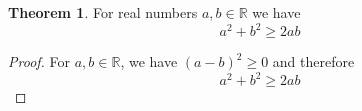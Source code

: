 \documentclass[12pt,a4paper]{article}
\theoremstyle{definition}
\newtheorem{theorem}{Theorem}
\begin{document}
	\begin{theorem}
		 For real numbers $ a,b\in\mathbb{R} $ we have  $$ a^2+b^2 \ge 2ab $$ 
	\end{theorem}
	\begin{proof}
		For $ a,b\in\mathbb{R} $, we have $ (a-b)^2 \ge 0 $ and therefore
		$$ a^2+b^2 \ge 2ab $$ 
	\end{proof}
\end{document}
